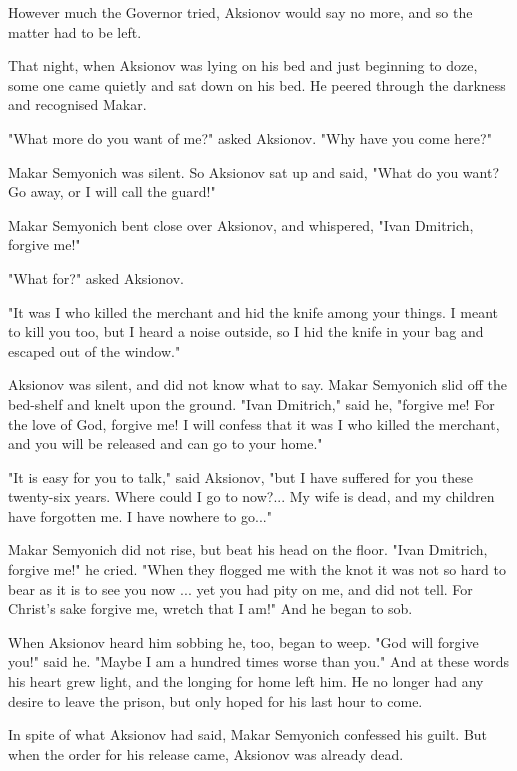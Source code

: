 However much the Governor tried, Aksionov would say no more, and so
the matter had to be left.

That night, when Aksionov was lying on his bed and just beginning to
doze, some one came quietly and sat down on his bed. He peered through
the darkness and recognised Makar.

"What more do you want of me?" asked Aksionov. "Why have you come
here?"

Makar Semyonich was silent. So Aksionov sat up and said, "What do you
want? Go away, or I will call the guard!"

Makar Semyonich bent close over Aksionov, and whispered, "Ivan
Dmitrich, forgive me!"

"What for?" asked Aksionov.

"It was I who killed the merchant and hid the knife among your things.
I meant to kill you too, but I heard a noise outside, so I hid the
knife in your bag and escaped out of the window."

Aksionov was silent, and did not know what to say. Makar Semyonich
slid off the bed-shelf and knelt upon the ground. "Ivan Dmitrich,"
said he, "forgive me! For the love of God, forgive me! I will confess
that it was I who killed the merchant, and you will be released and
can go to your home."

"It is easy for you to talk," said Aksionov, "but I have suffered for
you these twenty-six years. Where could I go to now?... My wife is
dead, and my children have forgotten me. I have nowhere to go..."

Makar Semyonich did not rise, but beat his head on the floor. "Ivan
Dmitrich, forgive me!" he cried. "When they flogged me with the knot
it was not so hard to bear as it is to see you now ... yet you had
pity on me, and did not tell. For Christ's sake forgive me, wretch
that I am!" And he began to sob.

When Aksionov heard him sobbing he, too, began to weep. "God will
forgive you!" said he. "Maybe I am a hundred times worse than you."
And at these words his heart grew light, and the longing for home left
him. He no longer had any desire to leave the prison, but only hoped
for his last hour to come.

In spite of what Aksionov had said, Makar Semyonich confessed his
guilt. But when the order for his release came, Aksionov was already
dead.
